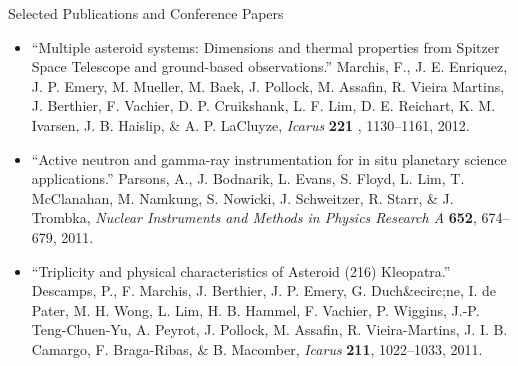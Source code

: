 \documentclass[11pt,oneside]{article}
\newenvironment{ressection}[1]{
	\vspace{4pt}
	{\Large#1}
	\begin{itemize}
	\vspace{3pt}
}{
	\end{itemize}
}
\newcommand{\resitem}[1]{
	\vspace{-4pt}
	\item \begin{flushleft} #1 \end{flushleft}
}
\begin{document}
\begin{ressection}{Selected Publications and Conference Papers}
\resitem{ ``Multiple asteroid systems: Dimensions and thermal properties from Spitzer 
Space Telescope and ground-based observations.'' Marchis, F., J. E. 
Enriquez, J. P. Emery, M. Mueller, M. Baek, J. Pollock, M. Assafin, R. 
Vieira Martins, J. Berthier, F. Vachier, D. P. Cruikshank, L. F. Lim, D. E. 
Reichart, K. M. Ivarsen, J. B. Haislip, 
\& A. P. LaCluyze,  {\it Icarus} {\bf 221 }, 1130--1161, 2012.  
}


\resitem{ ``Active neutron and gamma-ray instrumentation for in situ planetary 
science applications.'' Parsons, A., J. Bodnarik, L. Evans, S. Floyd, L. 
Lim, T. McClanahan, M. Namkung, S. Nowicki, J. Schweitzer, R. Starr, 
\& J. Trombka,  {\it Nuclear Instruments and Methods in Physics Research A} {\bf 652}, 674--679, 2011.  
}




\resitem{ ``Triplicity and physical characteristics of Asteroid (216) Kleopatra.'' 
Descamps, P., F. Marchis, J. Berthier, J. P. Emery, G. Duch\&ecirc;ne, I. de 
Pater, M. H. Wong, L. Lim, H. B. Hammel, F. Vachier, P. Wiggins, J.-P. 
Teng-Chuen-Yu, A. Peyrot, J. Pollock, M. Assafin, R. Vieira-Martins, J. I. 
B. Camargo, F. Braga-Ribas, 
\& B. Macomber,  {\it Icarus} {\bf 211}, 1022--1033, 2011.  
}








\end{ressection}
\end{document}
